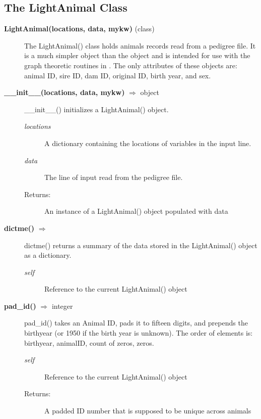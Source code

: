 \subsection*{The LightAnimal Class}
\begin{description}
\item[\textbf{LightAnimal(locations, data, mykw)} (class)]
The LightAnimal() class holds animals records read from a pedigree file. It is a much simpler object than the  object and is intended for use with the graph theoretic routines in . The only attributes of these objects are: animal ID, sire ID, dam ID, original ID, birth year, and sex.

\item[\textbf{\_\_init\_\_(locations, data, mykw)} $\Rightarrow$ object]
\_\_init\_\_() initializes a LightAnimal() object.
\begin{description}
\item[\emph{locations}] A dictionary containing the locations of variables in the input line.
\item[\emph{data}] The line of input read from the pedigree file.
\item[Returns:] An instance of a LightAnimal() object populated with data
\end{description}

\item[\textbf{dictme()} $\Rightarrow$]
dictme() returns a summary of the data stored in the LightAnimal() object as a dictionary.
\begin{description}
\item[\emph{self}] Reference to the current LightAnimal() object
\end{description}

\item[\textbf{pad\_id()} $\Rightarrow$ integer]
pad\_id() takes an Animal ID, pads it to fifteen digits, and prepends the birthyear (or 1950 if the birth year is unknown). The order of elements is: birthyear, animalID, count of zeros, zeros.
\begin{description}
\item[\emph{self}] Reference to the current LightAnimal() object
\item[Returns:] A padded ID number that is supposed to be unique across animals
\end{description}


\end{description}
